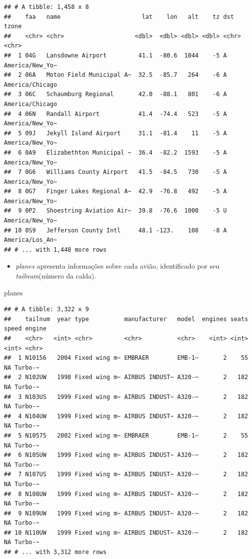\documentclass[
]{article}
\newenvironment{Shaded}{\begin{snugshade}}{\end{snugshade}}
\newcommand{\NormalTok}[1]{#1}
\providecommand{\tightlist}{%
  \setlength{\itemsep}{0pt}\setlength{\parskip}{0pt}}
\begin{document}
\begin{verbatim}
## # A tibble: 1,458 x 8
##    faa   name                       lat    lon   alt    tz dst   tzone          
##    <chr> <chr>                    <dbl>  <dbl> <dbl> <dbl> <chr> <chr>          
##  1 04G   Lansdowne Airport         41.1  -80.6  1044    -5 A     America/New_Yo~
##  2 06A   Moton Field Municipal A~  32.5  -85.7   264    -6 A     America/Chicago
##  3 06C   Schaumburg Regional       42.0  -88.1   801    -6 A     America/Chicago
##  4 06N   Randall Airport           41.4  -74.4   523    -5 A     America/New_Yo~
##  5 09J   Jekyll Island Airport     31.1  -81.4    11    -5 A     America/New_Yo~
##  6 0A9   Elizabethton Municipal ~  36.4  -82.2  1593    -5 A     America/New_Yo~
##  7 0G6   Williams County Airport   41.5  -84.5   730    -5 A     America/New_Yo~
##  8 0G7   Finger Lakes Regional A~  42.9  -76.8   492    -5 A     America/New_Yo~
##  9 0P2   Shoestring Aviation Air~  39.8  -76.6  1000    -5 U     America/New_Yo~
## 10 0S9   Jefferson County Intl     48.1 -123.    108    -8 A     America/Los_An~
## # ... with 1,448 more rows
\end{verbatim}

\begin{itemize}
\tightlist
\item
  \emph{planes} apresenta informações sobre cada avião, identificado por
  seu \emph{tailnum}(número da calda).
\end{itemize}

\begin{Shaded}
\begin{Highlighting}[]
\NormalTok{planes}
\end{Highlighting}
\end{Shaded}

\begin{verbatim}
## # A tibble: 3,322 x 9
##    tailnum  year type          manufacturer   model  engines seats speed engine 
##    <chr>   <int> <chr>         <chr>          <chr>    <int> <int> <int> <chr>  
##  1 N10156   2004 Fixed wing m~ EMBRAER        EMB-1~       2    55    NA Turbo-~
##  2 N102UW   1998 Fixed wing m~ AIRBUS INDUST~ A320-~       2   182    NA Turbo-~
##  3 N103US   1999 Fixed wing m~ AIRBUS INDUST~ A320-~       2   182    NA Turbo-~
##  4 N104UW   1999 Fixed wing m~ AIRBUS INDUST~ A320-~       2   182    NA Turbo-~
##  5 N10575   2002 Fixed wing m~ EMBRAER        EMB-1~       2    55    NA Turbo-~
##  6 N105UW   1999 Fixed wing m~ AIRBUS INDUST~ A320-~       2   182    NA Turbo-~
##  7 N107US   1999 Fixed wing m~ AIRBUS INDUST~ A320-~       2   182    NA Turbo-~
##  8 N108UW   1999 Fixed wing m~ AIRBUS INDUST~ A320-~       2   182    NA Turbo-~
##  9 N109UW   1999 Fixed wing m~ AIRBUS INDUST~ A320-~       2   182    NA Turbo-~
## 10 N110UW   1999 Fixed wing m~ AIRBUS INDUST~ A320-~       2   182    NA Turbo-~
## # ... with 3,312 more rows
\end{verbatim}
\end{document}
